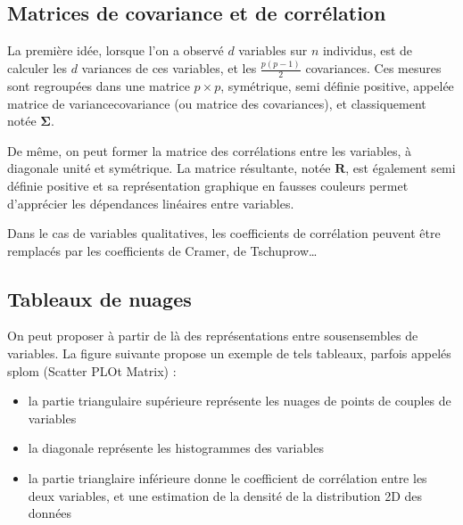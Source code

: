 \documentclass[letterpaper,10pt,english]{jupyterBook}
\begin{document}
\subsection{Matrices de covariance et de corrélation}
\label{\detokenize{statsdescriptives:matrices-de-covariance-et-de-correlation}}
\sphinxAtStartPar
La première idée, lorsque l’on a observé \(d\) variables sur \(n\) individus, est de calculer les \(d\) variances de ces variables, et les \(\frac{p(p-1)}{2}\) covariances. Ces mesures sont regroupées dans une matrice \(p\times p\), symétrique, semi définie positive, appelée matrice de variance\sphinxhyphen{}covariance (ou matrice des covariances), et classiquement notée \(\boldsymbol\Sigma\).

\sphinxAtStartPar
De même, on peut former la matrice des corrélations entre les variables, à diagonale unité et symétrique. La matrice résultante, notée \(\mathbf R\), est également semi définie positive et sa représentation graphique en fausses couleurs permet d’apprécier les dépendances linéaires entre variables.

\sphinxAtStartPar
{}

\sphinxAtStartPar
Dans le cas de variables qualitatives, les coefficients de corrélation peuvent être remplacés par les coefficients de Cramer, de Tschuprow…


\subsection{Tableaux de nuages}
\label{\detokenize{statsdescriptives:tableaux-de-nuages}}
\sphinxAtStartPar
On peut proposer à partir de là des représentations entre sous\sphinxhyphen{}ensembles de variables. La figure suivante propose un exemple de tels tableaux, parfois appelés splom (Scatter PLOt Matrix) :
\begin{itemize}
\item {} 
\sphinxAtStartPar
la partie triangulaire supérieure représente les nuages de points de couples de variables

\item {} 
\sphinxAtStartPar
la diagonale représente les histogrammes des variables

\item {} 
\sphinxAtStartPar
la partie trianglaire inférieure donne le coefficient de corrélation entre les deux variables, et une estimation de la densité de la distribution 2D des données

\end{itemize}
\end{document}
